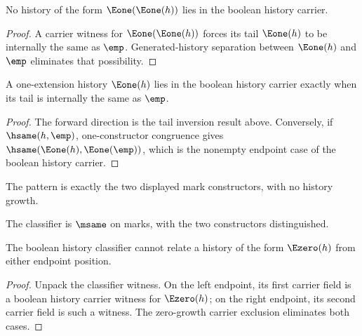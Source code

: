 \begin{theorem}
\label{thm:bool-history-carrier-double-one-absurd}
No history of the form \(\Eone(\Eone(h))\) lies in the boolean history carrier.
\end{theorem}
\begin{proof}
A carrier witness for \(\Eone(\Eone(h))\) forces its tail \(\Eone(h)\) to be
internally the same as \(\emp\). Generated-history separation between
\(\Eone(h)\) and \(\emp\) eliminates that possibility.
\end{proof}

\begin{theorem}
\label{thm:bool-history-carrier-e1-iff-tail-empty}
A one-extension history \(\Eone(h)\) lies in the boolean history carrier exactly
when its tail is internally the same as \(\emp\).
\end{theorem}
\begin{proof}
The forward direction is the tail inversion result above. Conversely, if
\(\hsame(h,\emp)\), one-constructor congruence gives
\(\hsame(\Eone(h),\Eone(\emp))\), which is the nonempty endpoint case of the
boolean history carrier.
\end{proof}

\begin{definition}
\label{def:bool-pattern-specification}
The pattern is exactly the two displayed mark constructors, with no history growth.
\end{definition}

\begin{definition}
\label{def:bool-classifier-specification}
The classifier is \(\msame\) on marks, with the two constructors distinguished.
\end{definition}

\begin{theorem}
\label{thm:bool-history-classifier-e0-endpoint-absurd}
The boolean history classifier cannot relate a history of the form \(\Ezero(h)\)
from either endpoint position.
\end{theorem}
\begin{proof}
Unpack the classifier witness. On the left endpoint, its first carrier field is
a boolean history carrier witness for \(\Ezero(h)\); on the right endpoint, its
second carrier field is such a witness. The zero-growth carrier exclusion
eliminates both cases.
\end{proof}

